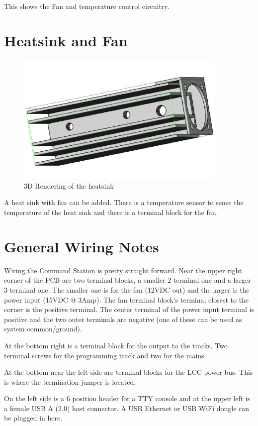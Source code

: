 This shows the Fan and temperature control circuitry.
\clearpage
\section{Heatsink and Fan}
\begin{figure}[hbpt]\begin{centering}%
\includegraphics[width=4in]{HeatSink3D.png}
\caption{3D Rendering of the heatsink}
\end{centering}\end{figure}

A heat sink with fan can be added.  There is a temperature sensor to sense the 
temperature of the heat sink and there is a terminal block for the fan.

\section{General Wiring Notes}

Wiring the Command Station is pretty straight forward. Near the upper right
corner of the PCB are two terminal blocks, a smaller 2 terminal one and a
larger 3 terminal one. The smaller one is for the fan (12VDC out) and the
larger is the power input (15VDC @ 3Amp).  The fan terminal block's terminal 
closest to the corner is the positive terminal.  The center terminal of the 
power input terminal is positive and the two outer terminals are negative (one 
of these can be used as system common/ground).

At the bottom right is a terminal block for the output to the tracks.  Two 
terminal screws for the programming track and two for the mains.

At the bottom near the left side are terminal blocks for the LCC power bus.  
This is where the termination jumper is located.

On the left side is a 6 position header for a TTY console and at the upper 
left is a female USB A (2.0) host connector.  A USB Ethernet or USB WiFi 
dongle can be plugged in here.

